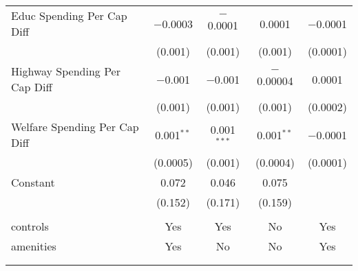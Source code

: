 \begin{table}[!htbp]
\begin{tabular}{@{\extracolsep{5pt}}lcccc}
  Educ Spending Per Cap Diff & $-$0.0003 & $-$0.0001 & 0.0001 & $-$0.0001 \\ 
  & (0.001) & (0.001) & (0.001) & (0.0001) \\ 
  Highway Spending Per Cap Diff & $-$0.001 & $-$0.001 & $-$0.00004 & 0.0001 \\ 
  & (0.001) & (0.001) & (0.001) & (0.0002) \\ 
  Welfare Spending Per Cap Diff & 0.001$^{**}$ & 0.001$^{***}$ & 0.001$^{**}$ & $-$0.0001 \\ 
  & (0.0005) & (0.001) & (0.0004) & (0.0001) \\ 
  Constant & 0.072 & 0.046 & 0.075 &  \\ 
  & (0.152) & (0.171) & (0.159) &  \\ 
 \hline \\[-1.8ex] 
controls & Yes & Yes & No & Yes \\ 
amenities & Yes & No & No & Yes \\ 
\hline \\[-1.8ex] 
\hline 
\hline \\[-1.8ex] 
\end{tabular} 
\end{table} 
